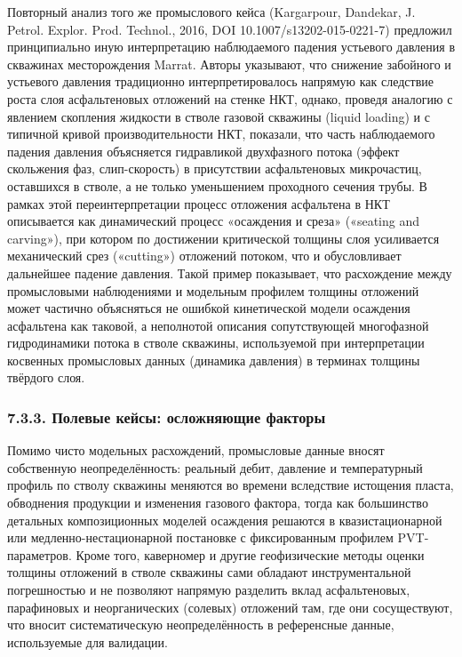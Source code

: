 \documentclass[11pt]{extarticle}
\begin{document}
Повторный анализ того же промыслового кейса (Kargarpour, Dandekar, J. Petrol. Explor. Prod. Technol., 2016, DOI 10.1007/s13202-015-0221-7) предложил принципиально иную интерпретацию наблюдаемого падения устьевого давления в скважинах месторождения Marrat. Авторы указывают, что снижение забойного и устьевого давления традиционно интерпретировалось напрямую как следствие роста слоя асфальтеновых отложений на стенке НКТ, однако, проведя аналогию с явлением скопления жидкости в стволе газовой скважины (liquid loading) и с типичной кривой производительности НКТ, показали, что часть наблюдаемого падения давления объясняется гидравликой двухфазного потока (эффект скольжения фаз, слип-скорость) в присутствии асфальтеновых микрочастиц, оставшихся в стволе, а не только уменьшением проходного сечения трубы. В рамках этой переинтерпретации процесс отложения асфальтена в НКТ описывается как динамический процесс «осаждения и среза» («seating and carving»), при котором по достижении критической толщины слоя усиливается механический срез («cutting») отложений потоком, что и обусловливает дальнейшее падение давления. Такой пример показывает, что расхождение между промысловыми наблюдениями и модельным профилем толщины отложений может частично объясняться не ошибкой кинетической модели осаждения асфальтена как таковой, а неполнотой описания сопутствующей многофазной гидродинамики потока в стволе скважины, используемой при интерпретации косвенных промысловых данных (динамика давления) в терминах толщины твёрдого слоя.

\subsubsection{7.3.3. Полевые кейсы: осложняющие факторы}\label{ux43fux43eux43bux435ux432ux44bux435-ux43aux435ux439ux441ux44b-ux43eux441ux43bux43eux436ux43dux44fux44eux449ux438ux435-ux444ux430ux43aux442ux43eux440ux44b}

Помимо чисто модельных расхождений, промысловые данные вносят собственную неопределённость: реальный дебит, давление и температурный профиль по стволу скважины меняются во времени вследствие истощения пласта, обводнения продукции и изменения газового фактора, тогда как большинство детальных композиционных моделей осаждения решаются в квазистационарной или медленно-нестационарной постановке с фиксированным профилем PVT-параметров. Кроме того, каверномер и другие геофизические методы оценки толщины отложений в стволе скважины сами обладают инструментальной погрешностью и не позволяют напрямую разделить вклад асфальтеновых, парафиновых и неорганических (солевых) отложений там, где они сосуществуют, что вносит систематическую неопределённость в референсные данные, используемые для валидации.
\end{document}
